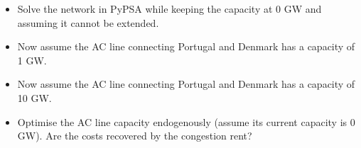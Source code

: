\documentclass[10pt]{article}
\newenvironment{problem}[2][Problem]{\begin{trivlist}
\item[\hskip \labelsep {\bfseries #1}\hskip \labelsep {\bfseries #2.}]}{\end{trivlist}}
\begin{document}
\begin{problem}{10.1}
\begin{itemize}
	\item[a)] Solve the network in PyPSA while keeping the capacity at 0 GW and assuming it cannot be extended.
	\item[b)] Now assume the AC line connecting Portugal and Denmark has a capacity of 1 GW.
	\item[c)] Now assume the AC line connecting Portugal and Denmark has a capacity of 10 GW.
	\item[d)] Optimise the AC line capacity endogenously (assume its current capacity is 0 GW). Are the costs recovered by the congestion rent?
\end{itemize}


\end{problem}

\
\end{document}
